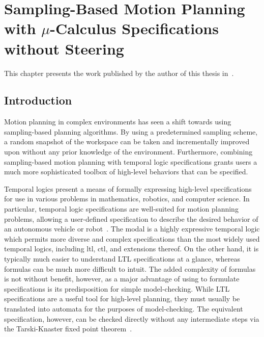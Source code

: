 
\chapter{\texorpdfstring{Sampling-Based Motion Planning with $\mu$-Calculus Specifications without Steering}{Sampling-Based Motion Planning with mu-Calculus Specifications without Steering}}
\label{chap:sstpaper}

This chapter presents the work published by the author of this thesis in~\cite{Larocque2018}.

\section{Introduction}

Motion planning in complex environments has seen a shift towards using sampling-based planning algorithms. By using a predetermined sampling scheme, a random snapshot of the workspace can be taken and incrementally improved upon without any prior knowledge of the environment. Furthermore, combining sampling-based motion planning with temporal logic specifications grants users a much more sophisticated toolbox of high-level behaviors that can be specified. 

Temporal logics present a means of formally expressing high-level specifications for use in various problems in mathematics, robotics, and computer science. In particular, temporal logic specifications are well-suited for motion planning problems, allowing a user-defined specification to describe the desired behavior of an autonomous vehicle or robot~\cite{Lin2014, Wolff2014}. The modal \mucalc{} is a highly expressive temporal logic which permits more diverse and complex specifications than the most widely used temporal logics, including \gls{ltl}, \gls{ctl}, and extensions thereof. On the other hand, it is typically much easier to understand LTL specifications at a glance, whereas \mucalc{} formulas can be much more difficult to intuit. The added complexity of \mucalc{} formulas is not without benefit, however, as a major advantage of using \mucalc{} to formulate specifications is its predisposition for simple model-checking. While LTL specifications are a useful tool for high-level planning, they must usually be translated into automata for the purposes of model-checking. The equivalent \mucalc{} specification, however, can be checked directly without any intermediate steps via the Tarski-Knaster fixed point theorem~\cite{Emerson1999, Tarski1955}.

